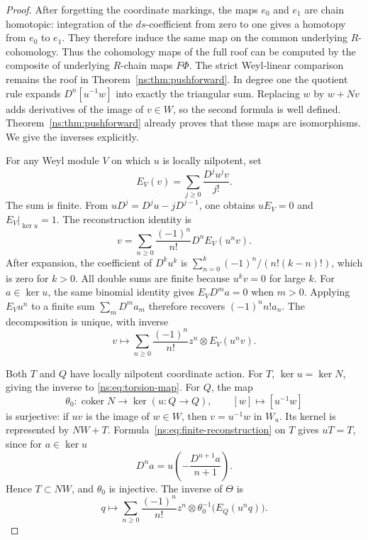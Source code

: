 \begin{proof}
After forgetting the coordinate markings, the maps \(e_0\) and
\(e_1\) are chain homotopic: integration of the \(ds\)-coefficient
from zero to one gives a homotopy from \(e_0\) to \(e_1\).
They therefore induce the same map on the common underlying
\(R\)-cohomology.  Thus the cohomology maps of the full roof can
be computed by the composite of underlying \(R\)-chain maps
\(F\Phi\).  The strict Weyl-linear comparison remains the roof
in Theorem~\ref{ns:thm:pushforward}.
In degree one the quotient rule expands \(D^n[u^{-1}w]\) into
exactly the triangular sum.
Replacing \(w\) by \(w+Nv\) adds derivatives of the image of
\(v\in W\), so the second formula is well defined.
Theorem~\ref{ns:thm:pushforward} already proves that these maps are
isomorphisms.  We give the inverses explicitly.

For any Weyl module \(V\) on which \(u\) is locally nilpotent, set
\begin{equation}\label{ns:eq:projector}
 E_V(v)=\sum_{j\geq0}\frac{D^ju^jv}{j!}.
\end{equation}
The sum is finite.  From
\(uD^j=D^ju-jD^{j-1}\), one obtains \(uE_V=0\) and
\(E_V|_{\ker u}=1\).  The reconstruction identity is
\begin{equation}\label{ns:eq:finite-reconstruction}
 v=\sum_{n\geq0}\frac{(-1)^n}{n!}D^nE_V(u^nv).
\end{equation}
After expansion, the coefficient of \(D^ku^k\) is
\(\sum_{n=0}^k(-1)^n/(n!(k-n)!)\), which is zero for \(k>0\).
All double sums are finite because \(u^kv=0\) for large \(k\).
For \(a\in\ker u\), the same binomial identity gives
\(E_VD^ma=0\) when \(m>0\).  Applying \(E_Vu^n\) to a finite
sum \(\sum_mD^ma_m\) therefore recovers \((-1)^nn!a_n\).
The decomposition is unique, with inverse
\begin{equation}\label{ns:eq:inverse-reconstruction}
 v\longmapsto\sum_{n\geq0}\frac{(-1)^n}{n!}
       z^n\otimes E_V(u^nv).
\end{equation}

Both \(T\) and \(Q\) have locally nilpotent coordinate action.
For \(T\), \(\ker u=\ker N\), giving the inverse to
\eqref{ns:eq:torsion-map}.  For \(Q\), the map
\[
 \theta_0:\operatorname{coker}N\longrightarrow\ker(u:Q\to Q),
 \qquad [w]\longmapsto[u^{-1}w]
\]
is surjective: if \(uv\) is the image of \(w\in W\), then
\(v=u^{-1}w\) in \(W_u\).  Its kernel is represented by
\(NW+T\).  Formula~\eqref{ns:eq:finite-reconstruction} on \(T\)
gives \(uT=T\), since for \(a\in\ker u\)
\[
 D^na=u\left(-\frac{D^{n+1}a}{n+1}\right).
\]
Hence \(T\subset NW\), and \(\theta_0\) is injective.
The inverse of \(\Theta\) is
\[
 q\longmapsto\sum_{n\geq0}\frac{(-1)^n}{n!}z^n\otimes
              \theta_0^{-1}\bigl(E_Q(u^nq)\bigr).
\]
\end{proof}

